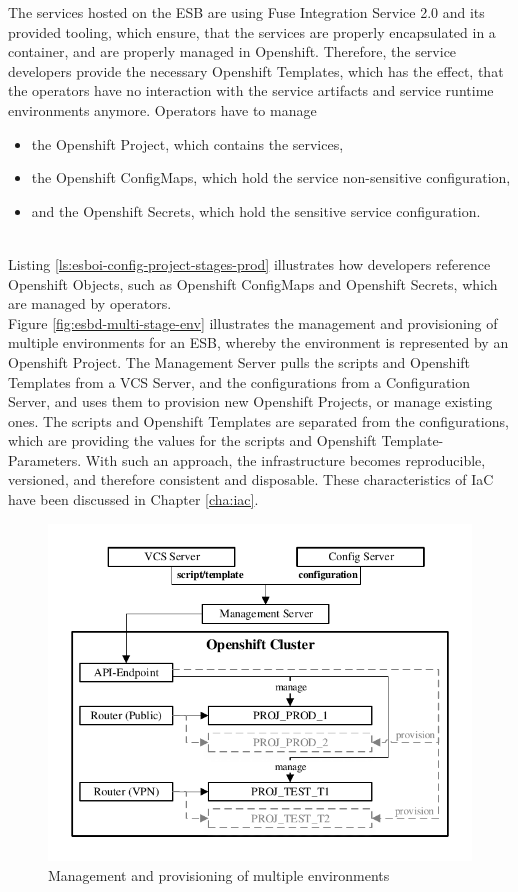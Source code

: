 The services hosted on the ESB are using Fuse Integration Service 2.0 and its provided tooling, which ensure, that the services are properly encapsulated in a container, and are properly managed in Openshift. Therefore, the service developers provide the necessary Openshift Templates, which has the effect, that the operators have no interaction with the service artifacts and service runtime environments anymore. Operators have to manage
\begin{itemize}
	\item the Openshift Project, which contains the services,
	\item the Openshift ConfigMaps, which hold the service non-sensitive configuration,
	\item and the Openshift Secrets, which hold the sensitive service configuration.
\end{itemize} 
\ \\
Listing \vref{ls:esboi-config-project-stages-prod} illustrates how developers reference Openshift Objects, such as Openshift ConfigMaps and Openshift Secrets, which are managed by operators. \\ 

Figure \vref{fig:esbd-multi-stage-env} illustrates the management and provisioning of multiple environments for an ESB, whereby the environment is represented by an Openshift Project. The Management Server pulls the scripts and Openshift Templates from a VCS Server, and the configurations from a Configuration Server, and uses them to provision new Openshift Projects, or manage existing ones. The scripts and Openshift Templates are separated from the configurations, which are providing the values for the scripts and Openshift Template-Parameters. With such an approach, the infrastructure becomes reproducible, versioned, and therefore consistent and disposable. These characteristics of IaC have been discussed in Chapter \vref{cha:iac}.
\newpage 

\begin{figure}[htbp]
	\centering
	\includegraphics[scale=1]{images/esbd-multi-stage-env.pdf}
	\caption{Management and provisioning of multiple environments}
	\label{fig:esbd-multi-stage-env}
\end{figure}


